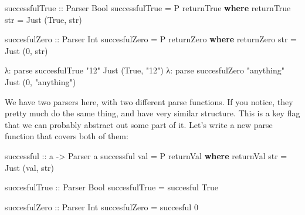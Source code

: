 \documentclass[]{article}
\newenvironment{Shaded}{}{}
\newcommand{\DataTypeTok}[1]{\textcolor[rgb]{0.56,0.13,0.00}{#1}}
\newcommand{\DecValTok}[1]{\textcolor[rgb]{0.25,0.63,0.44}{#1}}
\newcommand{\FunctionTok}[1]{\textcolor[rgb]{0.02,0.16,0.49}{#1}}
\newcommand{\KeywordTok}[1]{\textcolor[rgb]{0.00,0.44,0.13}{\textbf{#1}}}
\newcommand{\NormalTok}[1]{#1}
\newcommand{\OtherTok}[1]{\textcolor[rgb]{0.00,0.44,0.13}{#1}}
\newcommand{\StringTok}[1]{\textcolor[rgb]{0.25,0.44,0.63}{#1}}
\begin{document}
\begin{Shaded}
\begin{Highlighting}[]
\OtherTok{successfulTrue ::} \DataTypeTok{Parser} \DataTypeTok{Bool}
\NormalTok{successfulTrue }\FunctionTok{=} \DataTypeTok{P}\NormalTok{ returnTrue}
    \KeywordTok{where}
\NormalTok{        returnTrue str }\FunctionTok{=} \DataTypeTok{Just}\NormalTok{ (}\DataTypeTok{True}\NormalTok{, str)}

\OtherTok{succesfulZero ::} \DataTypeTok{Parser} \DataTypeTok{Int}
\NormalTok{succesfulZero }\FunctionTok{=} \DataTypeTok{P}\NormalTok{ returnZero}
    \KeywordTok{where}
\NormalTok{        returnZero str }\FunctionTok{=} \DataTypeTok{Just}\NormalTok{ (}\DecValTok{0}\NormalTok{, str)}
\end{Highlighting}
\end{Shaded}

\begin{Shaded}
\begin{Highlighting}[]
\NormalTok{λ}\FunctionTok{:}\NormalTok{ parse succesfulTrue }\StringTok{"12"}
\DataTypeTok{Just}\NormalTok{ (}\DataTypeTok{True}\NormalTok{, }\StringTok{"12"}\NormalTok{)}
\NormalTok{λ}\FunctionTok{:}\NormalTok{ parse succesfulZero }\StringTok{"anything"}
\DataTypeTok{Just}\NormalTok{ (}\DecValTok{0}\NormalTok{, }\StringTok{"anything"}\NormalTok{)}
\end{Highlighting}
\end{Shaded}

We have two parsers here, with two different parse functions. If you notice,
they pretty much do the same thing, and have very similar structure. This is a
key flag that we can probably abstract out some part of it. Let's write a new
parse function that covers both of them:

\begin{Shaded}
\begin{Highlighting}[]
\OtherTok{successful ::}\NormalTok{ a }\OtherTok{->} \DataTypeTok{Parser}\NormalTok{ a}
\NormalTok{successful val }\FunctionTok{=} \DataTypeTok{P}\NormalTok{ returnVal}
    \KeywordTok{where}
\NormalTok{        returnVal str }\FunctionTok{=} \DataTypeTok{Just}\NormalTok{ (val, str)}

\OtherTok{succesfulTrue ::} \DataTypeTok{Parser} \DataTypeTok{Bool}
\NormalTok{succesfulTrue }\FunctionTok{=}\NormalTok{ succesful }\DataTypeTok{True}

\OtherTok{succesfulZero ::} \DataTypeTok{Parser} \DataTypeTok{Int}
\NormalTok{succesfulZero }\FunctionTok{=}\NormalTok{ succesful }\DecValTok{0}
\end{Highlighting}
\end{Shaded}
\end{document}
